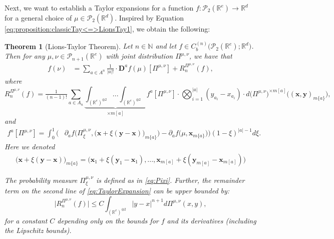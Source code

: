 \documentclass[a4paper,11pt,twoside]{article}
\numberwithin{equation}{section}
\theoremstyle{plain}
\newtheorem{theorem}{Theorem}[section]
\newcommand{\bN}{\mathbb{N}}
\newcommand{\bR}{\mathbb{R}}
\newcommand{\cP}{\mathcal{P}}
\newcommand{\rD}{\mathbf{D}}
\newcommand{\1}{\mathbbm{1}}
\begin{document}
	Next, we want to establish a Taylor expansions for a function $f:\cP_2(\bR^e) \to \bR^d$ for a general choice of $\mu \in \cP_2(\bR^d)$. Inspired by Equation \eqref{eq:proposition:classicTay<=>LionsTay1}, we obtain the following:
	\begin{theorem}[Lions-Taylor Theorem]
		\label{theorem:LionsTaylor1}
		Let $n \in \bN$ and let $f\in C_b^{(n)} \big( \cP_2(\bR^e); \bR^d \big)$. Then for any $\mu, \nu \in \cP_{n+1} (\bR^e)$ with joint distribution $\Pi^{\mu, \nu}$, we have that
		\begin{align}
			\label{eq:TaylorExpansion}
			f(\nu) &= \sum_{a\in A^n} \frac{1}{|a|!} \cdot \rD^a f(\mu)[\Pi^{\mu, \nu}]  + R_n^{\Pi^{\mu, \nu}}(f), 
		\end{align}
		where
		\begin{equation*}
			R_n^{\Pi^{\mu, \nu}}(f) 
			= \tfrac{1}{(n-1)!} \sum_{a\in A_{n}} \underbrace{\int_{(\bR^e)^{\oplus 2}} ... \int_{(\bR^e)^{\oplus 2}} }_{\times m[a]} f^{a}[\Pi^{\mu, \nu}] \cdot \bigotimes_{i=1}^{|a|} ( y_{a_i} - x_{a_i}) \cdot d\big( \Pi^{\mu, \nu}\big)^{\times m[a]} \Big( (\boldsymbol{x}, \boldsymbol{y})_{m\{a\}}\Big), 
		\end{equation*}
		and
		\begin{align*}
			f^{a}[\Pi^{\mu, \nu}] = \int_0^1 \bigg(& \partial_a f\Big( \Pi^{\mu, \nu}_\xi, \big(\boldsymbol{x} + \xi(\boldsymbol{y} - \boldsymbol{x} )\big)_{m\{a\}} \Big) 
			- \partial_a f\Big( \mu, \boldsymbol{x}_{m\{a\}} \Big) \bigg) (1-\xi)^{|a|-1} d\xi. 
		\end{align*}
		Here we denoted
		\begin{align*}
			\big( \boldsymbol{x} + \xi(\boldsymbol{y}-\boldsymbol{x}) \big)_{m\{a\}} 
			= 
			\Big( \boldsymbol{x}_1 + \xi(\boldsymbol{y}_1 - \boldsymbol{x}_1), ..., \boldsymbol{x}_{m[a]} + \xi(\boldsymbol{y}_{m[a]} - \boldsymbol{x}_{m[a]} ) \Big)
		\end{align*}
	
		The probability measure $\Pi^{\mu,\nu}_{\xi}$ is defined as in \eqref{eq:Pixi}. Further, the remainder term on the second line of \eqref{eq:TaylorExpansion} can be upper bounded by:
		\begin{equation}
			\label{eq:bound:remainder:TaylorExpansion}
			\bigl| R_n^{\Pi^{\mu, \nu}}(f) \bigr|
			\leq 
			C \int_{(\bR^e)^{\oplus 2}} |y-x|^{n+1} d\Pi^{\mu, \nu}(x, y),
		\end{equation}
		for a constant $C$ depending only on the bounds for $f$ and its derivatives (including the Lipschitz bounds).
	\end{theorem}
	
\end{document}
